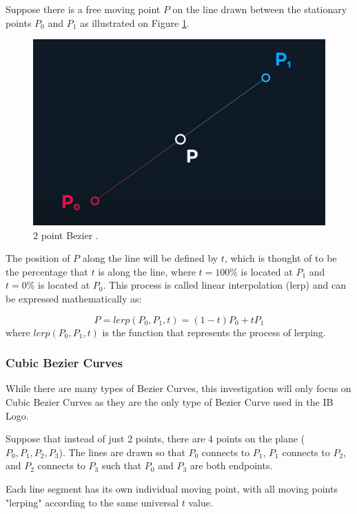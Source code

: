 \documentclass[letterpaper, 12pt]{article}
\begin{document}
Suppose there is a free moving point \(P\) on the line drawn between
the stationary points \(P_0\) and \(P_1\) as illustrated on
Figure \ref*{fig:2_point_bezier}.

\begin{figure}[H]
    \centering
    \includegraphics[width=.8\textwidth]{2_point_bezier.png}
    \caption{2 point Bezier \protect\cite{holmerBeautyBezierCurves2021}.}
    \label{fig:2_point_bezier}
\end{figure}

The position of \(P\) along the line will be defined by \(t\), which
is thought of to be the percentage that \(t\) is along the line,
where \(t = 100\%\) is located at \(P_1\) and \(t = 0\%\) is located
at \(P_0\). This process is called linear interpolation (lerp) and
can be expressed mathematically as:

\begin{equation}
    P = lerp(P_0, P_1, t) = (1-t)P_0 + tP_1
    \label{eq:lerp_def}
\end{equation}
where \(lerp(P_0, P_1, t)\) is the function that represents the
process of lerping.


\subsubsection{Cubic Bezier Curves}

While there are many types of Bezier Curves, this investigation will
only focus on Cubic Bezier Curves as they are the only type of Bezier
Curve used in the IB Logo.

Suppose that instead of just 2 points, there are 4 points on the
plane (\(P_0, P_1, P_2, P_3\)). The lines are drawn so that
\(P_0\) connects to \(P_1\), \(P_1\) connects to \(P_2\), and
\(P_2\) connects to \(P_3\) such that \(P_0\) and \(P_3\) are both
endpoints.

Each line segment has its own individual moving point, with all moving
points "lerping" according to the same universal \(t\) value.
\end{document}
